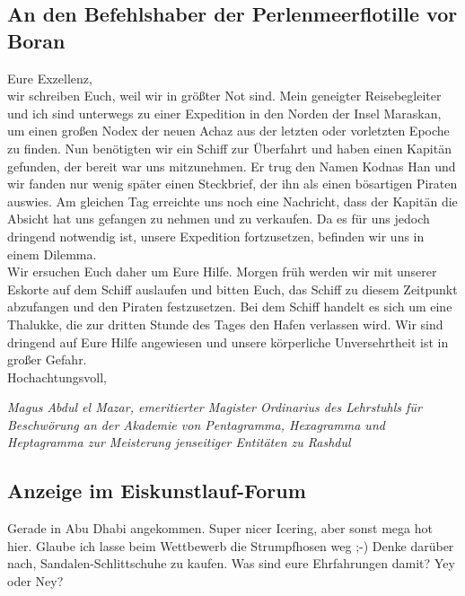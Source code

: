 \documentclass[final]{multiversum}
\begin{document}
\subsection{An den Befehlshaber der Perlenmeerflotille vor Boran}
Eure Exzellenz,\\[1em]
wir schreiben Euch, weil wir in größter Not sind.
Mein geneigter Reisebegleiter und ich sind unterwegs zu einer Expedition in den Norden der Insel Maraskan, um einen großen Nodex der neuen Achaz aus der letzten oder vorletzten Epoche zu finden.
Nun benötigten wir ein Schiff zur Überfahrt und haben einen Kapitän gefunden, der bereit war uns mitzunehmen.
Er trug den Namen Kodnas Han und wir fanden nur wenig später einen Steckbrief, der ihn als einen bösartigen Piraten auswies.
Am gleichen Tag erreichte uns noch eine Nachricht, dass der Kapitän die Absicht hat uns gefangen zu nehmen und zu verkaufen.
Da es für uns jedoch dringend notwendig ist, unsere Expedition fortzusetzen, befinden wir uns in einem Dilemma.\\
Wir ersuchen Euch daher um Eure Hilfe.
Morgen früh werden wir mit unserer Eskorte auf dem Schiff auslaufen und bitten Euch, das Schiff zu diesem Zeitpunkt abzufangen und den Piraten festzusetzen.
Bei dem Schiff handelt es sich um eine Thalukke, die zur dritten Stunde des Tages den Hafen verlassen wird.
Wir sind dringend auf Eure Hilfe angewiesen und unsere körperliche Unversehrtheit ist in großer Gefahr.\\[1em]
Hochachtungsvoll,
\begin{flushright}
    \textit{Magus Abdul el Mazar, emeritierter Magister Ordinarius des Lehrstuhls für Beschwörung an der Akademie von Pentagramma, Hexagramma und Heptagramma zur Meisterung jenseitiger Entitäten zu Rashdul}
\end{flushright}

\subsection{Anzeige im Eiskunstlauf-Forum}
Gerade in Abu Dhabi angekommen. 
Super nicer Icering, aber sonst mega hot hier.
Glaube ich lasse beim Wettbewerb die Strumpfhosen weg ;-)
Denke darüber nach, Sandalen-Schlittschuhe zu kaufen.
Was sind eure Ehrfahrungen damit?
Yey oder Ney?
\end{document}
